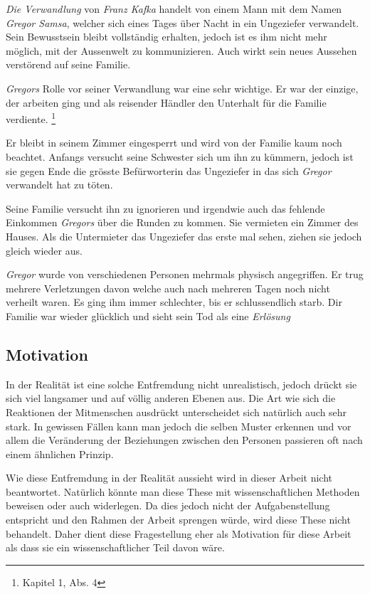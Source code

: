 \documentclass[12pt,a4paper,twoside,titlepage]{article}
\begin{document}
	\textit{Die Verwandlung} von \textit{Franz Kafka} handelt von einem Mann mit dem Namen \textit{Gregor Samsa}, welcher sich eines Tages über Nacht in ein Ungeziefer verwandelt. Sein Bewusstsein bleibt vollständig erhalten, jedoch ist es ihm nicht mehr möglich, mit der Aussenwelt zu kommunizieren. Auch wirkt sein neues Aussehen verstörend auf seine Familie.
	
	\textit{Gregors} Rolle vor seiner Verwandlung war eine sehr wichtige. Er war der einzige, der arbeiten ging und als reisender Händler den Unterhalt für die Familie verdiente. \footnote{\cite{verwandlung} Kapitel 1, Abs. 4}
	
	Er bleibt in seinem Zimmer eingesperrt und wird von der Familie kaum noch beachtet. Anfangs versucht seine Schwester sich um ihn zu kümmern, jedoch ist sie gegen Ende die grösste Befürworterin das Ungeziefer in das sich \textit{Gregor} verwandelt hat zu töten.
	
	Seine Familie versucht ihn zu ignorieren und irgendwie auch das fehlende Einkommen \textit{Gregors} über die Runden zu kommen. Sie vermieten ein Zimmer des Hauses. Als die Untermieter das Ungeziefer das erste mal sehen, ziehen sie jedoch gleich wieder aus.
	
	\textit{Gregor} wurde von verschiedenen Personen mehrmals physisch angegriffen. Er trug mehrere Verletzungen davon welche auch nach mehreren Tagen noch nicht verheilt waren. Es ging ihm immer schlechter, bis er schlussendlich starb. Dir Familie war wieder glücklich und sieht sein Tod als eine \textit{Erlösung}
	
	\subsection{Motivation}
	
	In der Realität ist eine solche Entfremdung nicht unrealistisch, jedoch drückt sie sich viel langsamer und auf völlig anderen Ebenen aus. Die Art wie sich die Reaktionen der Mitmenschen ausdrückt unterscheidet sich natürlich auch sehr stark. In gewissen Fällen kann man jedoch die selben Muster erkennen und vor allem die Veränderung der Beziehungen zwischen den Personen passieren oft nach einem ähnlichen Prinzip. 
	
	Wie diese Entfremdung in der Realität aussieht wird in dieser Arbeit nicht beantwortet. Natürlich könnte man diese These mit wissenschaftlichen Methoden beweisen oder auch widerlegen. Da dies jedoch nicht der Aufgabenstellung entspricht und den Rahmen der Arbeit sprengen würde, wird diese These nicht behandelt. Daher dient diese Fragestellung eher als Motivation für diese Arbeit als dass sie ein wissenschaftlicher Teil davon wäre.
	
\end{document}
